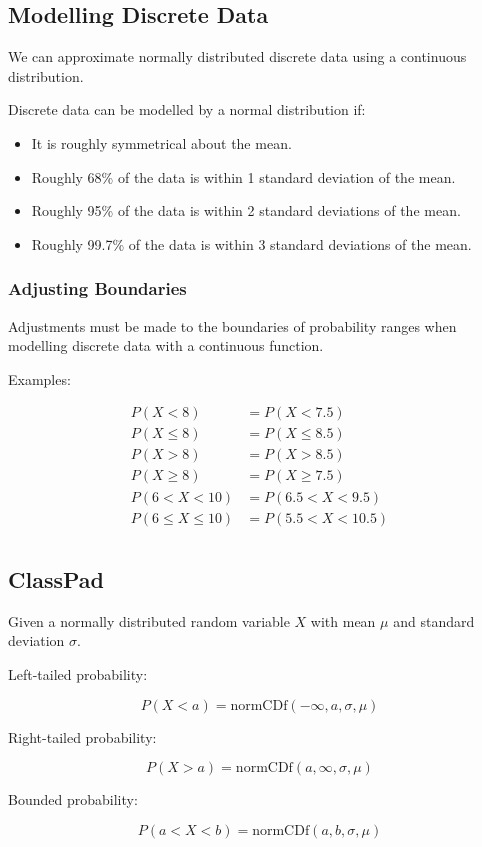 \documentclass[a4paper,11pt]{article}
\begin{document}
\subsection{Modelling Discrete Data}

We can approximate normally distributed discrete data using a continuous
distribution.

Discrete data can be modelled by a normal distribution if:

\begin{itemize}
\item It is roughly symmetrical about the mean.
\item Roughly 68\% of the data is within 1 standard deviation of the mean.
\item Roughly 95\% of the data is within 2 standard deviations of the mean.
\item Roughly 99.7\% of the data is within 3 standard deviations of the mean.
\end{itemize}


\subsubsection{Adjusting Boundaries}

Adjustments must be made to the boundaries of probability ranges when modelling
discrete data with a continuous function.

Examples:

$$
\begin{aligned}
P(X < 8) & = P(X < 7.5) \\
P(X \leq 8) & = P(X \leq 8.5) \\
P(X > 8) & = P(X > 8.5) \\
P(X \geq 8) & = P(X \geq 7.5) \\
P(6 < X < 10) & = P(6.5 < X < 9.5) \\
P(6 \leq X \leq 10) & = P(5.5 < X < 10.5) \\
\end{aligned}
$$


\subsection{ClassPad}

Given a normally distributed random variable $X$ with mean $\mu$ and standard
deviation $\sigma$.

Left-tailed probability:

$$
P(X < a) = \text{normCDf}(-\infty, a, \sigma, \mu)
$$

Right-tailed probability:

$$
P(X > a) = \text{normCDf}(a, \infty, \sigma, \mu)
$$

Bounded probability:

$$
P(a < X < b) = \text{normCDf}(a, b, \sigma, \mu)
$$
\end{document}
